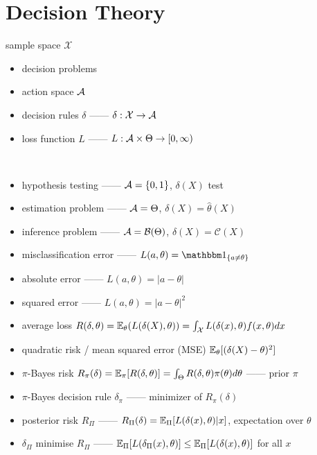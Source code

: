 \section{Decision Theory}\label{sec:decision-theory}

\begin{setting}
    sample space $\mathcal{X}$
\end{setting}

\begin{itemize}
    \item decision problems
    \item action space $\mathcal{A}$
    \item decision rules $\delta$ ------ $\delta:\mathcal{X} \rightarrow \mathcal{A}$
    \item loss function $L$ ------ $L:\mathcal{A} \times \Theta \rightarrow [0, \infty)$
\end{itemize}

\begin{example}\,
    \begin{itemize}
        \item hypothesis testing ------ $\mathcal{A} = \left\{ 0, 1 \right\}$, $\delta(X)$ test
        \item estimation problem ------ $\mathcal{A} = \Theta$, $\delta(X) = \hat \theta(X)$
        \item inference problem ------ $\mathcal{A} = \mathcal{B}(\Theta)$, $\delta(X) = \mathcal{C}(X)$
    \end{itemize}
\end{example}


\begin{itemize}
    \item misclassification error ------ $L(a, \theta) = \In_{\left\{ a \neq \theta \right\}}$
    \item absolute error ------ $L(a, \theta) = |a - \theta|$
    \item squared error ------ $L(a, \theta) = |a - \theta|^2$
    \item average loss $R(\delta, \theta) = \mathbb{E}_\theta(L(\delta(X), \theta)) = \int_\mathcal{X} L(\delta(x), \theta)f(x, \theta)dx$
    \item quadratic risk / mean squared error (MSE) $\mathbb{E}_\theta[(\delta(X) - \theta)^2]$
    \item $\pi$-Bayes risk $R_\pi(\delta) = \mathbb{E}_\pi[R(\delta, \theta)] = \int_\Theta R(\delta, \theta)\pi(\theta) d\theta$ ------ prior $\pi$
    \item $\pi$-Bayes decision rule $\delta_{\pi}$ ------ minimizer of $R_\pi(\delta)$
    \item posterior risk $R_\Pi$ ------ $R_\Pi(\delta) = \mathbb{E}_\Pi[L(\delta(x), \theta)|x]$, expectation over $\theta$
    \item $\delta_{\Pi}$ minimise $R_\Pi$ ------ $\mathbb{E}_\Pi[L(\delta_\Pi(x), \theta)] \leq \mathbb{E}_{\Pi}[L(\delta(x), \theta)]$ for all $x$
\end{itemize}

